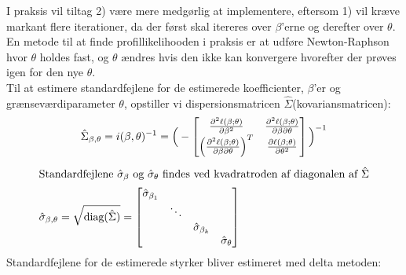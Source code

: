 \documentclass[11pt,a4paper]{article}
\begin{document}
I praksis vil tiltag 2) være mere medgørlig at implementere, eftersom 1) vil kræve markant flere iterationer, da der først skal itereres over $\beta$'erne og derefter over $\theta$. En metode til at finde profillikelihooden i praksis er at udføre Newton-Raphson hvor $\theta$ holdes fast, og $\theta$ ændres hvis den ikke kan konvergere hvorefter der prøves igen for den nye $\theta$.\\
Til at estimere standardfejlene for de estimerede koefficienter, $\beta$'er og grænseværdiparameter $\theta$, opstiller vi dispersionsmatricen $\hat{\Sigma}$(kovariansmatricen): \begin{align*}
&\hat{\Sigma}_{\beta,\theta}=i(\beta,\theta)^{-1}=
\Big{(}-\begin{bmatrix}
\frac{\partial^2 \ell(\beta;\theta)}{\partial \beta^2} &\frac{\partial^2 \ell(\beta;\theta)}{\partial \beta \partial \theta} \\
\Big{(}\frac{\partial^2 \ell(\beta;\theta)}{\partial \beta \partial \theta}\Big{)}^T & \frac{\partial \ell(\beta;\theta)}{\partial \theta^2}
\end{bmatrix}\Big{)}^{-1}\\
\end{align*}
\begin{align}
\intertext{Standardfejlene $\hat{\sigma}_\beta$ og $\hat{\sigma}_\theta$ findes ved kvadratroden af diagonalen af $\hat{\Sigma}$}
\hat{\sigma}_{\beta,\theta}=\sqrt{\text{diag}(\hat{\Sigma})}=
\begin{bmatrix}
\hat{\sigma}_{\beta_1}& &\\
& \ddots & \\
& & \hat{\sigma}_{\beta_k} \\
& & & \hat{\sigma}_{\theta}
\end{bmatrix}
\end{align}
Standardfejlene for de estimerede styrker bliver estimeret med delta metoden:\\
\end{document}
